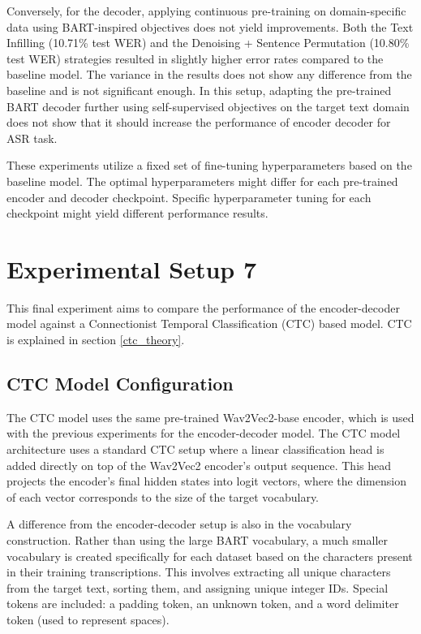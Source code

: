 Conversely, for the decoder, applying continuous pre-training on domain-specific data using BART-inspired objectives does not yield improvements. Both the Text Infilling (10.71\% test WER) and the Denoising + Sentence Permutation (10.80\% test WER) strategies resulted in slightly higher error rates compared to the baseline model. The variance in the results does not show any difference from the baseline and is not significant enough. In this setup, adapting the pre-trained BART decoder further using self-supervised objectives on the target text domain does not show that it should increase the performance of encoder decoder for ASR task.

These experiments utilize a fixed set of fine-tuning hyperparameters based on the baseline model. The optimal hyperparameters might differ for each pre-trained encoder and decoder checkpoint. Specific hyperparameter tuning for each checkpoint might yield different performance results.


\section{Experimental Setup 7}
\label{exp:ctc_comparison}

This final experiment aims to compare the performance of the encoder-decoder model against a Connectionist Temporal Classification (CTC) based model. CTC is explained in section \ref{ctc_theory}.

\subsection{CTC Model Configuration}
The CTC model uses the same pre-trained Wav2Vec2-base encoder, which is used with the previous experiments for the encoder-decoder model. The CTC model architecture uses a standard CTC setup where a linear classification head is added directly on top of the Wav2Vec2 encoder's output sequence. This head projects the encoder's final hidden states into logit vectors, where the dimension of each vector corresponds to the size of the target vocabulary.

A difference from the encoder-decoder setup is also in the vocabulary construction. Rather than using the large BART vocabulary, a much smaller vocabulary is created specifically for each dataset based on the characters present in their training transcriptions. This involves extracting all unique characters from the target text, sorting them, and assigning unique integer IDs. Special tokens are included: a padding token, an unknown token, and a word delimiter token (used to represent spaces). 

